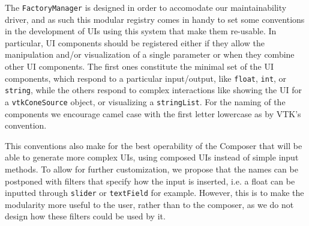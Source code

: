 The \verb|FactoryManager| is designed in order to accomodate our maintainability driver, and as such this modular registry comes in handy to set some conventions in the development of UIs using this system that make them re-usable. In particular, UI components should be registered either if they allow the manipulation and/or visualization of a single parameter or when they combine other UI components. The first ones constitute the minimal set of the UI components, which respond to a particular input/output, like \verb|float|, \verb|int|, or \verb|string|, while the others respond to complex interactions like showing the UI for a \verb|vtkConeSource| object, or visualizing a \verb|stringList|. For the naming of the components we encourage camel case with the first letter lowercase as by VTK's convention. 

This conventions also make for the best operability of the Composer that will be able to generate more complex UIs, using composed UIs instead of simple input methods. To allow for further customization, we propose that the names can be postponed with filters that specify how the input is inserted, i.e. a float can be inputted through \verb|slider| or \verb|textField| for example. However, this is to make the modularity more useful to the user, rather than to the composer, as we do not design how these filters could be used by it.
